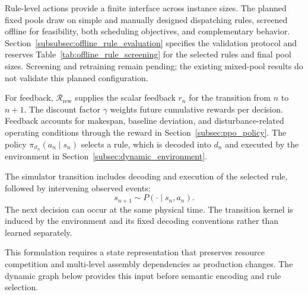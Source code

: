 Rule-level actions provide a finite interface across instance sizes. The planned fixed pools draw
on simple and manually designed dispatching rules, screened offline for feasibility, both scheduling
objectives, and complementary behavior. Section~\ref{subsubsec:offline_rule_evaluation} specifies
the validation protocol and reserves Table~\ref{tab:offline_rule_screening} for the selected rules
and final pool sizes. Screening and retraining remain pending; the existing mixed-pool results do
not validate this planned configuration.

For feedback,
$\mathcal R_{\mathrm{rew}}$ supplies the scalar feedback $r_n$ for the transition from $n$ to $n+1$.
The discount factor $\gamma$ weights future cumulative rewards per decision. Feedback accounts for makespan, baseline deviation,
and disturbance-related operating conditions through the reward in Section~\ref{subsec:ppo_policy}.
The policy $\pi_{\vartheta_n}(a_n\mid s_n)$ selects a rule, which is decoded into $d_n$
and executed by the environment in Section~\ref{subsec:dynamic_environment}.

The simulator transition includes decoding and execution of the selected rule, followed by intervening observed events:
\begin{equation}
 s_{n+1}\sim P(\cdot\mid s_n,a_n).
 \label{eq:state_transition}
\end{equation}
The next decision can occur at the same physical time. The transition kernel is induced by the environment
and its fixed decoding conventions rather than learned separately.


This formulation requires a state representation that preserves resource competition and
multi-level assembly dependencies as production changes. The dynamic graph below provides this
input before semantic encoding and rule selection.

